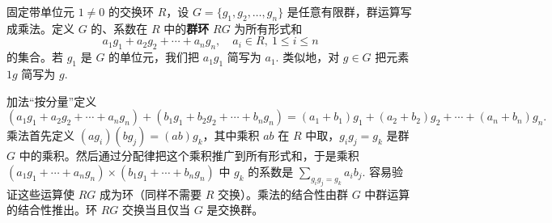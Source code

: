 固定带单位元 \(1 \neq 0\) 的交换环 \(R\)，设 \(G = \{g_1, g_2, \ldots, g_n\}\) 是任意有限群，群运算写成乘法。定义 \(G\) 的、系数在 \(R\) 中的\textbf{群环} \(RG\) 为所有形式和
\[
a_1g_1 + a_2g_2 + \cdots + a_ng_n, \quad a_i \in R,\ 1 \leq i \leq n
\]
的集合。若 \(g_1\) 是 \(G\) 的单位元，我们把 \(a_1g_1\) 简写为 \(a_1\). 类似地，对 \(g \in G\) 把元素 \(1g\) 简写为 \(g\).

加法“按分量”定义
\[
(a_1g_1 + a_2g_2 + \cdots + a_ng_n) + (b_1g_1 + b_2g_2 + \cdots + b_ng_n) = (a_1+b_1)g_1 + (a_2+b_2)g_2 + \cdots + (a_n+b_n)g_n.
\]
乘法首先定义 \((ag_i)(bg_j) = (ab)g_k\)，其中乘积 \(ab\) 在 \(R\) 中取，\(g_ig_j = g_k\) 是群 \(G\) 中的乘积。然后通过分配律把这个乘积推广到所有形式和，于是乘积 \((a_1g_1 + \cdots + a_ng_n) \times (b_1g_1 + \cdots + b_ng_n)\) 中 \(g_k\) 的系数是 \(\sum_{g_ig_j = g_k} a_ib_j\). 容易验证这些运算使 \(RG\) 成为环（同样不需要 \(R\) 交换）。乘法的结合性由群 \(G\) 中群运算的结合性推出。环 \(RG\) 交换当且仅当 \(G\) 是交换群。

